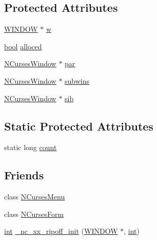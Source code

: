 \subsection*{Protected Attributes}
\begin{DoxyCompactItemize}
\item 
\hyperlink{curses_8priv_8h_aa64cc90e7a4df667d6c7249b77890d39}{W\-I\-N\-D\-O\-W} $\ast$ \hyperlink{class_n_curses_window_a72826363344950e11235001ee68a6228}{w}
\item 
\hyperlink{term__entry_8h_a002004ba5d663f149f6c38064926abac}{bool} \hyperlink{class_n_curses_window_a6a520256e76e5f1fb16a482891b2b3c3}{alloced}
\item 
\hyperlink{class_n_curses_window}{N\-Curses\-Window} $\ast$ \hyperlink{class_n_curses_window_a4e7da34aee4bba11c8d07447b85fcacb}{par}
\item 
\hyperlink{class_n_curses_window}{N\-Curses\-Window} $\ast$ \hyperlink{class_n_curses_window_af71bd8f44435f1b279d058096aad2154}{subwins}
\item 
\hyperlink{class_n_curses_window}{N\-Curses\-Window} $\ast$ \hyperlink{class_n_curses_window_a57fe372c9249af60c89e5d2a6375f071}{sib}
\end{DoxyCompactItemize}
\subsection*{Static Protected Attributes}
\begin{DoxyCompactItemize}
\item 
static long \hyperlink{class_n_curses_window_a77fd91029b36a2e10fd327ad2cf8f6ae}{count}
\end{DoxyCompactItemize}
\subsection*{Friends}
\begin{DoxyCompactItemize}
\item 
class \hyperlink{class_n_curses_window_abc3a7d96608af08df374875467e10000}{N\-Curses\-Menu}
\item 
class \hyperlink{class_n_curses_window_a4ce5a13a8b35977630ef1c99997ddb78}{N\-Curses\-Form}
\item 
\hyperlink{term__entry_8h_ad65b480f8c8270356b45a9890f6499ae}{int} \hyperlink{class_n_curses_window_afed78980fd0257126048688146a8baab}{\-\_\-nc\-\_\-xx\-\_\-ripoff\-\_\-init} (\hyperlink{curses_8priv_8h_aa64cc90e7a4df667d6c7249b77890d39}{W\-I\-N\-D\-O\-W} $\ast$, \hyperlink{term__entry_8h_ad65b480f8c8270356b45a9890f6499ae}{int})
\end{DoxyCompactItemize}


